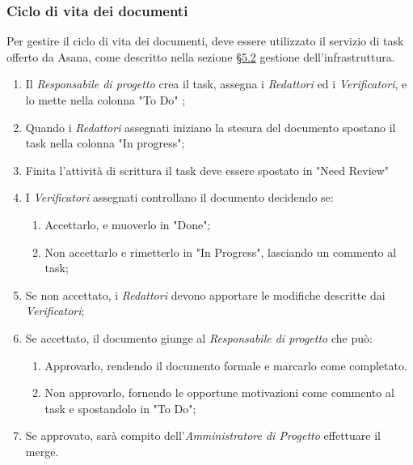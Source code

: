 \subsubsection{Ciclo di vita dei documenti}
Per gestire il ciclo di vita dei documenti, deve essere utilizzato il servizio di task offerto da Asana, come descritto nella sezione \hyperref[sec:documentversion]{§5.2} gestione dell'infrastruttura.
\begin{enumerate}
\item Il \textit{Responsabile di progetto} crea il task, assegna i \textit{Redattori} ed i \textit{Verificatori}, e lo mette nella colonna "To Do" ;
\item Quando i \textit{Redattori} assegnati iniziano la stesura del documento spostano il task nella colonna "In progress";
\item Finita l'attività di scrittura il task deve essere spostato in "Need Review"
\item I \textit{Verificatori} assegnati controllano il documento decidendo se:
	\begin{enumerate}
	 	\item Accettarlo, e muoverlo in "Done";
	 	\item Non accettarlo e rimetterlo in "In Progress", lasciando un commento al task;
	\end{enumerate}
\item Se non accettato, i \textit{Redattori} devono apportare le modifiche descritte dai \textit{Verificatori};
\item Se accettato, il documento giunge al \textit{Responsabile di progetto} che può:
\begin{enumerate}
	\item Approvarlo, rendendo il documento formale e marcarlo come completato.
	\item Non approvarlo, fornendo le opportune motivazioni come commento al task e spostandolo in "To Do";
\end{enumerate}
\item Se approvato, sarà compito dell'\textit{Amministratore di Progetto} effettuare il merge.
\end{enumerate}
